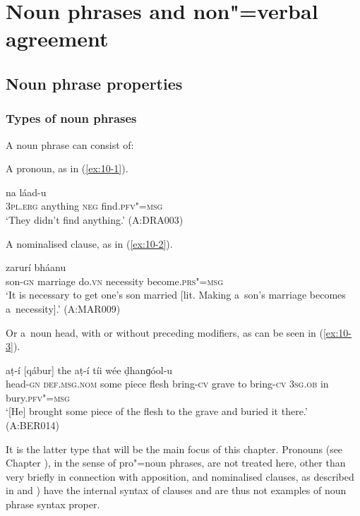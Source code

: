 \chapter{Noun phrases and non"=verbal agreement}
\label{chap:10}


\section{Noun phrase properties}
\label{sec:10-1}

\subsection{Types of noun phrases}
\label{subsec:10-1-1}


A noun phrase can consist of: 


A pronoun, as in (\ref{ex:10-1}).

\begin{exe}
\ex
\label{ex:10-1}
\gll [taním] [ɡa] na láad-u  \\
\textsc{3pl.erg} anything \textsc{neg} find.\textsc{pfv"=msg} \\
\glt `They didn't find anything.' (A:DRA003)
\end{exe}

A nominalised clause, as in (\ref{ex:10-2}).

\begin{exe}
\ex
\label{ex:10-2}
 zarurí bháanu \\
son-\textsc{gn} marriage do.\textsc{vn} necessity become.\textsc{prs"=msg}  \\
\glt `It is necessary to get one's son married [lit. Making a~son's marriage becomes a~necessity].' (A:MAR009)
\end{exe}

Or a~noun head, with or without preceding modifiers, as can be seen in (\ref{ex:10-3}).

\begin{exe}
\ex
\label{ex:10-3}
 aṭ-í [qábur] the aṭ-í tíi wée ḍhanɡóol-u \\
head-\textsc{gn} \textsc{def.msg.nom} some piece flesh bring-\textsc{cv} grave  to bring-\textsc{cv} \textsc{3sg.ob} in bury.\textsc{pfv"=msg}  \\
\glt `[He] brought some piece of the flesh to the grave and buried it there.' (A:BER014)
\end{exe}

It is the latter type that will be the main focus of this chapter. Pronouns (see Chapter ), in the sense of pro"=noun phrases, are not treated here, other than very briefly in connection with apposition, and nominalised clauses, as described in  and ) have the internal syntax of clauses and are thus not examples of noun phrase syntax proper. 


